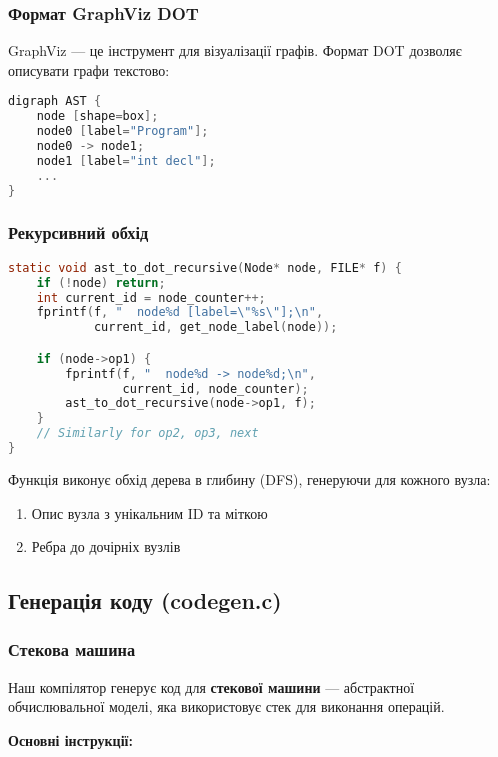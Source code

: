 \documentclass[12pt,a4paper]{article}
\begin{document}
\subsubsection{Формат GraphViz DOT}

GraphViz --- це інструмент для візуалізації графів. Формат DOT дозволяє описувати графи текстово:

\begin{lstlisting}[language=C]
digraph AST {
    node [shape=box];
    node0 [label="Program"];
    node0 -> node1;
    node1 [label="int decl"];
    ...
}
\end{lstlisting}

\subsubsection{Рекурсивний обхід}

\begin{lstlisting}[language=C]
static void ast_to_dot_recursive(Node* node, FILE* f) {
    if (!node) return;
    int current_id = node_counter++;
    fprintf(f, "  node%d [label=\"%s\"];\n", 
            current_id, get_node_label(node));

    if (node->op1) {
        fprintf(f, "  node%d -> node%d;\n", 
                current_id, node_counter);
        ast_to_dot_recursive(node->op1, f);
    }
    // Similarly for op2, op3, next
}
\end{lstlisting}

Функція виконує обхід дерева в глибину (DFS), генеруючи для кожного вузла:
\begin{enumerate}
    \item Опис вузла з унікальним ID та міткою
    \item Ребра до дочірніх вузлів
\end{enumerate}

\subsection{Генерація коду (codegen.c)}

\subsubsection{Стекова машина}

Наш компілятор генерує код для \textbf{стекової машини} --- абстрактної обчислювальної моделі, яка використовує стек для виконання операцій.

\textbf{Основні інструкції:}
\end{document}
